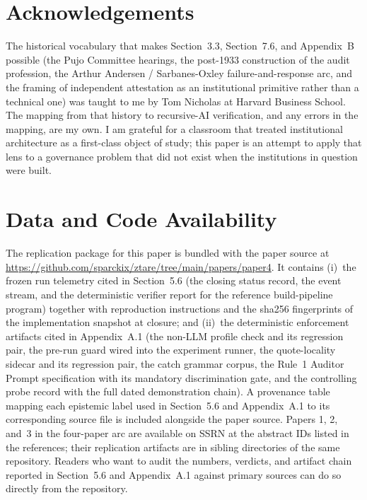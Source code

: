 \documentclass[11pt]{article}
\begin{document}
\section*{Acknowledgements}

The historical vocabulary that makes Section~3.3, Section~7.6, and Appendix~B possible (the Pujo Committee hearings, the post-1933 construction of the audit profession, the Arthur Andersen / Sarbanes-Oxley failure-and-response arc, and the framing of independent attestation as an institutional primitive rather than a technical one) was taught to me by Tom Nicholas at Harvard Business School. The mapping from that history to recursive-AI verification, and any errors in the mapping, are my own. I am grateful for a classroom that treated institutional architecture as a first-class object of study; this paper is an attempt to apply that lens to a governance problem that did not exist when the institutions in question were built.


\section*{Data and Code Availability}

The replication package for this paper is bundled with the paper source at \url{https://github.com/sparckix/ztare/tree/main/papers/paper4}. It contains (i)~the frozen run telemetry cited in Section~5.6 (the closing status record, the event stream, and the deterministic verifier report for the reference build-pipeline program) together with reproduction instructions and the sha256 fingerprints of the implementation snapshot at closure; and (ii)~the deterministic enforcement artifacts cited in Appendix~A.1 (the non-LLM profile check and its regression pair, the pre-run guard wired into the experiment runner, the quote-locality sidecar and its regression pair, the catch grammar corpus, the Rule~1 Auditor Prompt specification with its mandatory discrimination gate, and the controlling probe record with the full dated demonstration chain). A provenance table mapping each epistemic label used in Section~5.6 and Appendix~A.1 to its corresponding source file is included alongside the paper source. Papers 1, 2, and~3 in the four-paper arc are available on SSRN at the abstract IDs listed in the references; their replication artifacts are in sibling directories of the same repository. Readers who want to audit the numbers, verdicts, and artifact chain reported in Section~5.6 and Appendix~A.1 against primary sources can do so directly from the repository.




\end{document}
